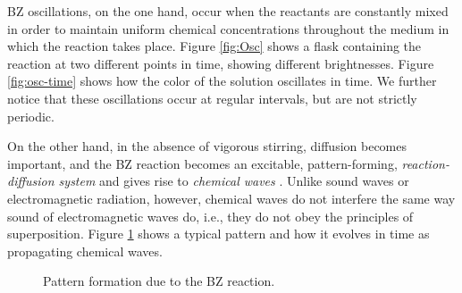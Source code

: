\documentclass[twocolumn,amsmath,amssymb,aps]{revtex4}
\begin{document}
BZ oscillations, on the one hand, occur when the reactants are constantly mixed in order to maintain uniform chemical concentrations throughout the medium in which the reaction takes place.  Figure \ref{fig:Osc} shows a flask containing the reaction at two different points in time, showing different brightnesses. Figure \ref{fig:osc-time} shows how the color of the solution oscillates in time. We further notice that these oscillations occur at regular intervals, but are not strictly periodic. 


On the other hand, in the absence of vigorous stirring, diffusion becomes important, and the BZ reaction becomes an excitable, pattern-forming, \textit{reaction-diffusion system} and gives rise to \textit{chemical waves} \cite{ball1999self}. Unlike sound waves or electromagnetic radiation, however, chemical waves do not interfere the same way sound of electromagnetic waves do, i.e., they do not obey the principles of superposition.  Figure \ref{fig:Pattern} shows a typical pattern and how it evolves in time as propagating chemical waves. 


\begin{figure}[!htb]
	\centering
	\vspace{+15pt}
	\caption{Pattern formation due to the BZ reaction.}
	\label{fig:Pattern}
\end{figure}
\end{document}
